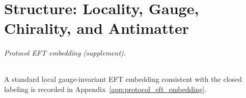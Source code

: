 \part{Structure: Locality, Gauge, Chirality, and Antimatter}






\paragraph{Protocol EFT embedding (supplement).}
\InterfaceTag A standard local gauge-invariant EFT embedding consistent with the closed labeling is recorded in Appendix~\ref{app:protocol_eft_embedding}.


